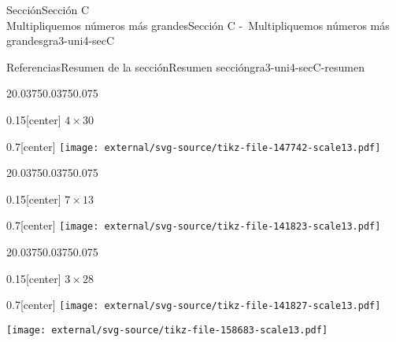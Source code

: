 \begin{sectionptx}{Sección}{{\Large Sección C\\}Multipliquemos números más grandes}{}{Sección C -~Multipliquemos números más grandes}{}{}{gra3-uni4-secC}
\begin{references-subsection}{Referencias}{Resumen de la sección}{}{Resumen sección}{}{}{gra3-uni4-secC-resumen}
\begin{sidebyside}{2}{0.0375}{0.0375}{0.075}%
\begin{sbspanel}{0.15}[center]%
\(4\times 30\)%
\end{sbspanel}%
\begin{sbspanel}{0.7}[center]%
\texttt{[image: external/svg-source/tikz-file-147742-scale13.pdf]}
\end{sbspanel}%
\end{sidebyside}%
\begin{sidebyside}{2}{0.0375}{0.0375}{0.075}%
\begin{sbspanel}{0.15}[center]%
\(7\times 13\)%
\end{sbspanel}%
\begin{sbspanel}{0.7}[center]%
\texttt{[image: external/svg-source/tikz-file-141823-scale13.pdf]}
\end{sbspanel}%
\end{sidebyside}%
\begin{sidebyside}{2}{0.0375}{0.0375}{0.075}%
\begin{sbspanel}{0.15}[center]%
\(3\times 28\)%
\end{sbspanel}%
\begin{sbspanel}{0.7}[center]%
\texttt{[image: external/svg-source/tikz-file-141827-scale13.pdf]}
\par
\texttt{[image: external/svg-source/tikz-file-158683-scale13.pdf]}
\end{sbspanel}%
\end{sidebyside}%
\end{references-subsection}
\end{sectionptx}
%
%
\typeout{************************************************}
\typeout{************************************************}
%
